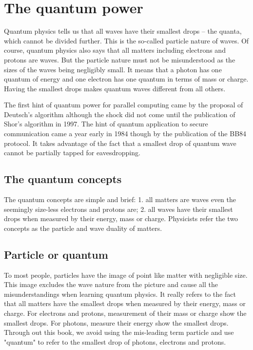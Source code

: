 \documentclass{book}
\begin{document}
\section{The quantum power}
Quantum physics tells us that all waves have their smallest drops -- the quanta, which cannot be divided further. This is the so-called particle nature of waves. Of course, quantum physics also says that all matters including electrons and protons are waves. But the particle nature must not be misunderstood as the sizes of the waves being negligibly small. It means that a photon has one quantum of energy and one electron has one quantum in terms of mass or charge. Having the smallest drops makes quantum waves different from all others.

The first hint of quantum power for parallel computing came by the proposal of Deutsch's algorithm\cite{1985Deutsch} although the shock did not come until the publication of Shor's algorithm in 1997. The hint of quantum application to secure communication came a year early in 1984 though by the publication of the BB84 protocol\cite{BB84}. It takes advantage of the fact that a smallest drop of quantum wave cannot be partially tapped for eavesdropping.

\subsection{The quantum concepts}
The quantum concepts are simple and brief: 1. all matters are waves even the seemingly size-less electrons and protons are; 2. all waves have their smallest drops when measured by their energy, mass or charge. Physicists refer the two concepts as the particle and wave duality of matters.

\subsection{Particle or quantum}
To most people, particles have the image of point like matter with negligible size. This image excludes the wave nature from the picture and cause all the misunderstandings when learning quantum physics. It really refers to the fact that all matters have the smallest drops when measured by their energy, mass or charge. For electrons and protons, measurement of their mass or charge show the smallest drops. For photons, measure their energy show the smallest drops. Through out this book, we avoid using the mis-leading term particle and use "quantum" to refer to the smallest drop of photons, electrons and protons.
\end{document}
